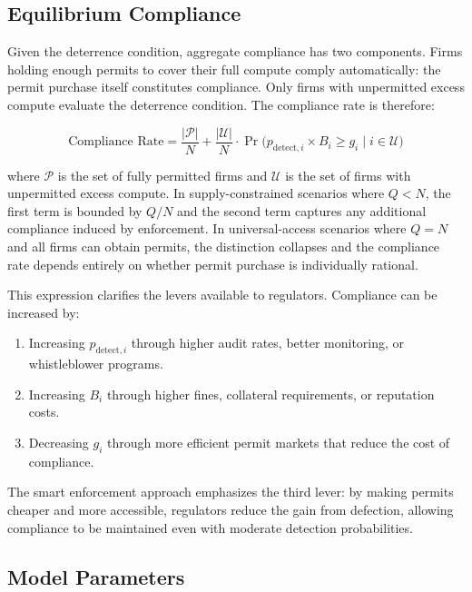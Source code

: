 \subsection{Equilibrium Compliance}

Given the deterrence condition, aggregate compliance has two components. Firms holding enough permits to cover their full compute comply automatically: the permit purchase itself constitutes compliance. Only firms with unpermitted excess compute evaluate the deterrence condition. The compliance rate is therefore:

\begin{equation}
\text{Compliance Rate} = \frac{|\mathcal{P}|}{N} + \frac{|\mathcal{U}|}{N} \cdot \Pr\!\big(p_{\mathrm{detect},i} \times B_i \geq g_i \;\big|\; i \in \mathcal{U}\big)
\end{equation}

where $\mathcal{P}$ is the set of fully permitted firms and $\mathcal{U}$ is the set of firms with unpermitted excess compute. In supply-constrained scenarios where $Q < N$, the first term is bounded by $Q/N$ and the second term captures any additional compliance induced by enforcement. In universal-access scenarios where $Q = N$ and all firms can obtain permits, the distinction collapses and the compliance rate depends entirely on whether permit purchase is individually rational.

This expression clarifies the levers available to regulators. Compliance can be increased by:

\begin{enumerate}
    \item Increasing $p_{\mathrm{detect},i}$ through higher audit rates, better monitoring, or whistleblower programs.
    \item Increasing $B_i$ through higher fines, collateral requirements, or reputation costs.
    \item Decreasing $g_i$ through more efficient permit markets that reduce the cost of compliance.
\end{enumerate}

The smart enforcement approach emphasizes the third lever: by making permits cheaper and more accessible, regulators reduce the gain from defection, allowing compliance to be maintained even with moderate detection probabilities.

\subsection{Model Parameters}


